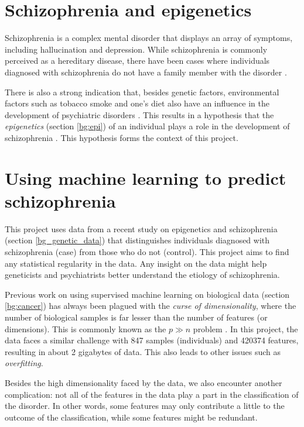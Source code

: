 \documentclass[12pt, twoside, a4paper]{report}
\begin{document}
\section{Schizophrenia and epigenetics}
\label{intro:epi}

Schizophrenia is a complex mental disorder that displays an array of symptoms, including hallucination and depression. While schizophrenia is commonly perceived as a hereditary disease, there have been cases where individuals diagnosed with schizophrenia do not have a family member with the disorder \cite{RefWorks:8}. 

There is also a strong indication that, besides genetic factors, environmental factors such as tobacco smoke and one's diet also have an influence in the development of psychiatric disorders \cite{RefWorks:8, RefWorks:10, RefWorks:247}. This results in a hypothesis that the \textit{epigenetics} (section \ref{bg:epi}) of an individual plays a role in the development of schizophrenia \cite{RefWorks:12}. This hypothesis forms the context of this project.


\section{Using machine learning to predict schizophrenia} \label{intro_ML}

This project uses data from a recent study on epigenetics and schizophrenia (section \ref{bg_genetic_data}) that distinguishes individuals diagnosed with schizophrenia (case) from those who do not (control). This project aims to find any statistical regularity in the data. Any insight on the data might help geneticists and psychiatrists better understand the etiology of schizophrenia.

Previous work on using supervised machine learning on biological data (section \ref{bg:cancer}) has always been plagued with the \textit{curse of dimensionality}, where the number of biological samples is far lesser than the number of features (or dimensions). This is commonly known as the $p \gg n$ problem \cite{RefWorks:96}. In this project, the data faces a similar challenge with 847 samples (individuals) and 420374 features, resulting in about 2 gigabytes of data. This also leads to other issues such as \textit{overfitting}. 

Besides the high dimensionality faced by the data, we also encounter another complication: not all of the features in the data play a part in the classification of the disorder. In other words, some features may only contribute a little to the outcome of the classification, while some features might be redundant.
\end{document}
